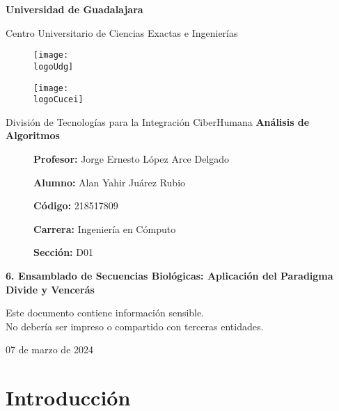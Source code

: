 \documentclass[12pt, a4paper]{article} %
\title{\theTitle}
\author{\theAuthor}
\newcommand{\logoUdg}{../../../../../attachments/images/portada-udg.jpeg}
\newcommand{\logoCucei}{../../../../../attachments/images/portada-cucei.jpeg}
\newcommand{\materia}{Análisis de Algoritmos}
\newcommand{\theTitle}{6. Ensamblado de Secuencias Biológicas: Aplicación del Paradigma Divide y Vencerás}
\newcommand{\profesor}{Jorge Ernesto López Arce Delgado}
\newcommand{\theAuthor}{Alan Yahir Juárez Rubio}
\newcommand{\code}{218517809}
\newcommand{\carrera}{Ingeniería en Cómputo}
\newcommand{\seccion}{D01}
\newcommand{\startDate}{07 de marzo de 2024}
\newcommand{\nl}{\par\vspace{0.4cm}}
\begin{document}
\cfoot{\thepage} %

\begin{titlepage}
	\centering
	{\huge\textbf{Universidad de Guadalajara}}\par\vspace{0.6cm}
	{\LARGE{Centro Universitario de Ciencias Exactas e Ingenierías}}\vfill
	
	\begin{figure}[h]
		\begin{minipage}[t]{0.45\textwidth}
			\centering
			\texttt{[image: \\logoUdg]}
		\end{minipage}
		\hfill
		\begin{minipage}[t]{0.45\textwidth}
			\centering
			\texttt{[image: \\logoCucei]}
		\end{minipage}
	\end{figure}\vfill
	
	{\Large{División de Tecnologías para la Integración CiberHumana}}\vfill
	{\Large\textbf{\materia}}\vfill
	\begin{figure}[h]
		\centering
		\begin{minipage}[t]{0.75\textwidth}
			{\Large
				\textbf{Profesor:} \profesor\nl
				\textbf{Alumno:} \theAuthor\nl
				\textbf{Código:} \code\nl
				\textbf{Carrera:} \carrera\nl
				\textbf{Sección:} \seccion
			}
		\end{minipage}
	\end{figure}\vfill
	{\LARGE{\textbf{\theTitle}}}\vfill
	
	\begin{tcolorbox}[colback=red!5!white, colframe=red!75!black]
		\centering
		Este documento contiene información sensible.\\
		No debería ser impreso o compartido con terceras entidades.
	\end{tcolorbox}\vfill
	{\large \startDate}\par
\end{titlepage}

\clearpage
\tableofcontents

\clearpage
\listoffigures
	

\clearpage
\section{Introducción}
\end{document}
